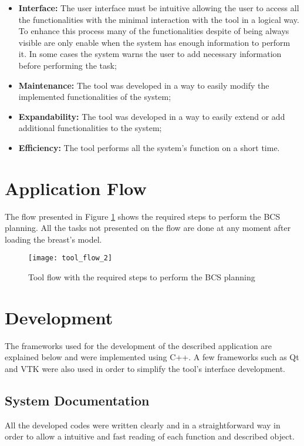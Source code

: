 \begin{itemize}
\item \textbf{Interface:} The user interface must be intuitive allowing the user to access all the functionalities with the minimal interaction with the tool in a logical way. To enhance this process many of the functionalities despite of being always visible are only enable when the system has enough information to perform it. In some cases the system warns the user to add necessary information before performing the task;
\item \textbf{Maintenance:} The tool was developed in a way to easily modify the implemented functionalities of the system;
\item \textbf{Expandability:} The tool was developed in a way to easily extend or add additional functionalities to the system;
\item \textbf{Efficiency:} The tool performs all the system's function on a short time.
\end{itemize}


\section{Application Flow}

The flow presented in Figure \ref{fig:tool_flow} shows the required steps to perform the BCS planning. All the tasks not presented on the flow are done at any moment after loading the breast's model.

\begin{figure}[!h]
\begin{center}
    \leavevmode
    \texttt{[image: tool\_flow\_2]}
    \caption[BCS planning tool flow]{Tool flow with the required steps to perform the BCS planning}
    \label{fig:tool_flow}
  \end{center}
\end{figure}

\section{Development}

The frameworks used for the development of the described application are explained below and were implemented using C++. A few frameworks such as Qt and VTK were also used in order to simplify the tool's interface development.

\subsection{System Documentation}
All the developed codes were written clearly and in a straightforward way in order to allow a intuitive and fast reading of each function and described object.

